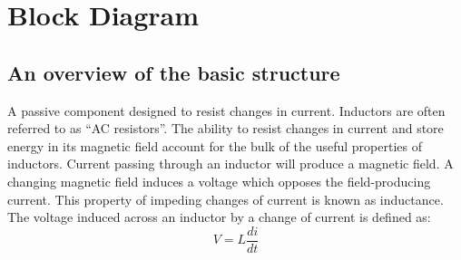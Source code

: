 \chapter{Block Diagram}

\section{An overview of the basic structure}

\hspace{10mm}A passive component designed to resist changes in current. Inductors are often referred to as “AC resistors”. The ability
to resist changes in current and store energy in its magnetic field account for the bulk of the useful properties of inductors. Current passing through an inductor will produce a magnetic field. A changing magnetic field induces a voltage which opposes the field-producing current. This property of impeding changes of current is known as inductance. The voltage induced across an inductor by a change of current is defined as:
$$V = L \frac{di}{dt}$$
